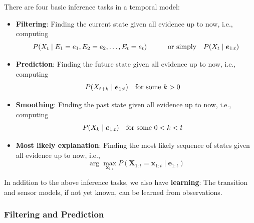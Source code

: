 \documentclass[10pt,UTF8]{article}
\theoremstyle{definition}
\newtheorem{definition inner}{Definition}[section]
\theoremstyle{definition}
\newtheorem{theorem inner}{Theorem}[section]
\theoremstyle{definition}
\newtheorem*{proof inner}{\textit{Proof}}
\theoremstyle{plain}
\newtheorem{tip inner}{Tip}[section]
\theoremstyle{remark}
\begin{document}
There are four basic inference tasks in a temporal model:
\begin{itemize}
  \item \textbf{Filtering}:
    Finding the current state given all evidence up to now, i.e.,
    computing
    \begin{equation*}
      P(X_t \mid E_1 = e_1, E_2 = e_2, \ldots, E_t = e_t)
      \qquad\qq{or simply}
      P(X_t \mid \bm{e}_{1:t})
    \end{equation*}
  \item \textbf{Prediction}:
    Finding the future state given all evidence up to now, i.e.,
    computing
    \begin{equation*}
      P(X_{t+k} \mid \bm{e}_{1:t})
      \qq{for some \(k > 0\)}
    \end{equation*}
  \item \textbf{Smoothing}:
    Finding the past state given all evidence up to now, i.e.,
    computing
    \begin{equation*}
      P(X_{k} \mid \bm{e}_{1:t})
      \qq{for some \(0 < k < t\)}
    \end{equation*}
  \item \textbf{Most likely explanation}:
    Finding the most likely sequence of states given all evidence up
    to now, i.e.,
    \begin{equation*}
      \arg\max_{\bm{x}_{1:t}}
      P(\bm{X}_{1:t} = \bm{x}_{1:t} \mid \bm{e}_{1:t})
    \end{equation*}
\end{itemize}

In addition to the above inference tasks,
we also have \textbf{learning}:
The transition and sensor models, if not yet known,
can be learned from observations.

\subsubsection{Filtering and Prediction}
\end{document}
